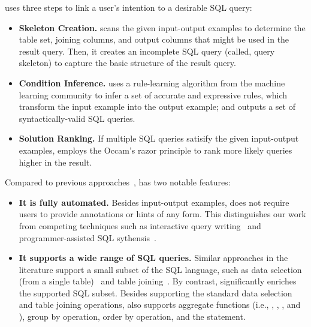 \ourtool uses three steps to link a user's intention to
a desirable SQL query:



\begin{itemize}
\item \textbf{Skeleton Creation.} \ourtool scans the
given input-output examples to determine the table
set, joining columns, and output columns that might
be used in the result query. Then, it creates an
incomplete SQL query (called, query skeleton) to
capture the basic structure of the result query.

\item \textbf{Condition Inference.} \ourtool
uses a rule-learning algorithm from the machine
learning community to infer a set of accurate
and expressive rules, which transform the input
example into the output example; and
outputs a set of syntactically-valid SQL
queries.


\item \textbf{Solution Ranking.} If multiple SQL
queries satisify the given input-output examples,
\ourtool employs the Occam's razor principle to
rank more likely queries higher in the result.
\end{itemize}

Compared to previous approaches~\cite{Zloof:1975,
Tran:2009, DasSarma:2010, abs-1208-2013}, \ourtool has two notable features:

\begin{itemize}
\item \textbf{It is fully automated.} Besides input-output
examples, \ourtool does not require users to provide
annotations or hints of any form. 
This distinguishes our work from competing techniques such as
interactive query writing~\cite{Zloof:1975} and
programmer-assisted SQL sythensis~\cite{abs-1208-2013}.

\item \textbf{It supports a wide range of SQL queries.}
Similar approaches in the literature support
a small subset of the SQL language, such as data selection
(from a single table)~\cite{Zloof:1975, DasSarma:2010}
and table joining~\cite{Tran:2009, DasSarma:2010, abs-1208-2013}. By contrast, 
\ourtool significantly enriches the supported SQL subset.
Besides supporting the standard data selection and table joining
operations, \ourtool also supports aggregate functions (i.e.,
, , ,
and ), group by operation,
order by operation, and the 
statement. 
\end{itemize}


